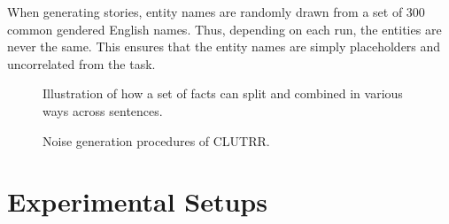 \documentclass[letterpaper, 12pt]{report}
\begin{document}
When generating stories, entity names are randomly drawn from a set of 300 common gendered English names.
Thus, depending on each run, the entities are never the same.
This ensures that the entity names are simply placeholders and uncorrelated from the task.



\begin{figure}[t]
\centering
{}
\caption{Illustration of how a set of facts can split and combined in various ways across sentences.}
\label{fig:clutrr:lang_composition}
\end{figure}


\begin{figure}[t]
\centering
{}
\caption{Noise generation procedures of CLUTRR.}
\label{fig:clutrr:data_noise}
\end{figure}



\section{Experimental Setups}
\label{sec:clutrr_setups}
\end{document}
